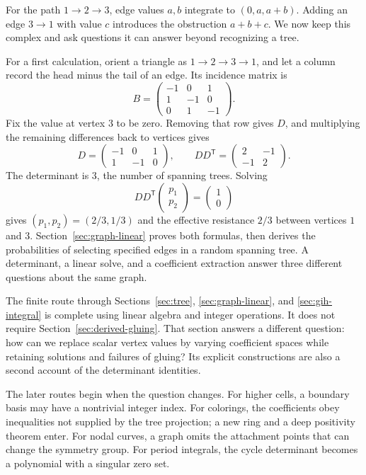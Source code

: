 \documentclass[11pt]{article}
\theoremstyle{definition}
\theoremstyle{remark}
\begin{document}
For the path \(1\to2\to3\), edge values \(a,b\) integrate to \((0,a,a+b)\). Adding an edge \(3\to1\) with value \(c\) introduces the obstruction \(a+b+c\). We now keep this complex and ask questions it can answer beyond recognizing a tree.

For a first calculation, orient a triangle as $1\to2\to3\to1$, and let a column record the head minus the tail of an edge. Its incidence matrix is
\[
 B=\begin{pmatrix}-1&0&1\\1&-1&0\\0&1&-1\end{pmatrix}.
\]
Fix the value at vertex $3$ to be zero. Removing that row gives $D$, and multiplying the remaining differences back to vertices gives
\[
 D=\begin{pmatrix}-1&0&1\\1&-1&0\end{pmatrix},\qquad
 DD^{\mathsf T}=\begin{pmatrix}2&-1\\-1&2\end{pmatrix}.
\]
The determinant is $3$, the number of spanning trees. Solving
\[
 DD^{\mathsf T}\begin{pmatrix}p_1\\p_2\end{pmatrix}
 =\begin{pmatrix}1\\0\end{pmatrix}
\]
gives $(p_1,p_2)=(2/3,1/3)$ and the effective resistance $2/3$ between vertices $1$ and $3$. Section~\ref{sec:graph-linear} proves both formulas, then derives the probabilities of selecting specified edges in a random spanning tree. A determinant, a linear solve, and a coefficient extraction answer three different questions about the same graph.

The finite route through Sections~\ref{sec:tree}, \ref{sec:graph-linear}, and \ref{sec:gih-integral} is complete using linear algebra and integer operations. It does not require Section~\ref{sec:derived-gluing}. That section answers a different question: how can we replace scalar vertex values by varying coefficient spaces while retaining solutions and failures of gluing? Its explicit constructions are also a second account of the determinant identities.

The later routes begin when the question changes. For higher cells, a boundary basis may have a nontrivial integer index. For colorings, the coefficients obey inequalities not supplied by the tree projection; a new ring and a deep positivity theorem enter. For nodal curves, a graph omits the attachment points that can change the symmetry group. For period integrals, the cycle determinant becomes a polynomial with a singular zero set.
\end{document}
